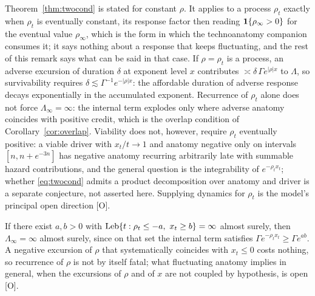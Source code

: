 \begin{remark}\label{rem:fluct}
Theorem~\ref{thm:twocond} is stated for constant $\rho$. It applies to a process $\rho_t$ exactly when $\rho_t$ is eventually constant, its response factor then reading $\mathbf{1}\{\rho_\infty>0\}$ for the eventual value $\rho_\infty$, which is the form in which the technoanatomy companion consumes it; it says nothing about a response that keeps fluctuating, and the rest of this remark says what can be said in that case. If $\rho=\rho_t$ is a process, an adverse excursion of duration $\delta$ at exponent level $x$ contributes
$\asymp\delta\,\Gamma e^{|\rho|x}$ to $\Lambda$, so survivability
requires $\delta\lesssim\Gamma^{-1}e^{-|\rho|x}$: the affordable
duration of adverse response decays exponentially in the accumulated
exponent. Recurrence of $\rho_t$ alone does not force
$\Lambda_\infty=\infty$: the internal term explodes only where adverse
anatomy coincides with positive credit, which is the overlap condition
of Corollary~\ref{cor:overlap}. Viability does not, however, require $\rho_t$ eventually positive: a viable driver with $x_t/t \to 1$ and anatomy negative only on intervals $[n, n + e^{-3n}]$ has negative anatomy recurring arbitrarily late with summable hazard contributions, and the general question is the integrability of $e^{-\rho_t x_t}$; whether \eqref{eq:twocond} admits a product decomposition over anatomy and driver is a separate conjecture, not asserted here. Supplying dynamics for
$\rho_t$ is the model's principal open direction [O].
\end{remark}

\begin{corollary}\label{cor:overlap}
If there exist $a,b>0$ with
$\operatorname{Leb}\{t:\rho_t\le-a,\ x_t\ge b\}=\infty$ almost surely, then
$\Lambda_\infty=\infty$ almost surely, since on that set the internal
term satisfies $\Gamma e^{-\rho_tx_t}\ge\Gamma e^{ab}$. A negative
excursion of $\rho$ that systematically coincides with $x_t\le0$ costs
nothing, so recurrence of $\rho$ is not by itself fatal; what
fluctuating anatomy implies in general, when the excursions of $\rho$
and of $x$ are not coupled by hypothesis, is open [O].
\end{corollary}

